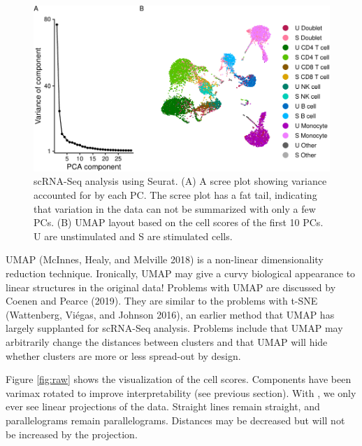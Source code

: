 \begin{figure}
\includegraphics{langevitour-article_files/figure-latex/standard-1} \caption{scRNA-Seq analysis using Seurat. (A) A scree plot showing variance accounted for by each PC. The scree plot has a fat tail, indicating that variation in the data can not be summarized with only a few PCs. (B) UMAP layout based on the cell scores of the first 10 PCs. U are unstimulated and S are stimulated cells.}\label{fig:standard}
\end{figure}

UMAP (McInnes, Healy, and Melville 2018) is a non-linear dimensionality reduction technique. Ironically, UMAP may give a curvy biological appearance to linear structures in the original data! Problems with UMAP are discussed by Coenen and Pearce (2019). They are similar to the problems with t-SNE (Wattenberg, Viégas, and Johnson 2016), an earlier method that UMAP has largely supplanted for scRNA-Seq analysis. Problems include that UMAP may arbitrarily change the distances between clusters and that UMAP will hide whether clusters are more or less spread-out by design.

Figure \ref{fig:raw} shows the  visualization of the cell scores. Components have been varimax rotated to improve interpretability (see previous section). With , we only ever see linear projections of the data. Straight lines remain straight, and parallelograms remain parallelograms. Distances may be decreased but will not be increased by the projection.

